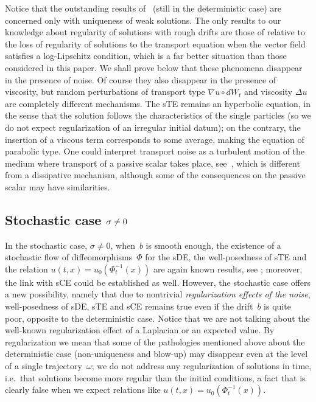 \documentclass[a4paper,10pt]{article}
\newcommand\1{\mathbbm{1}}
\numberwithin{equation}{section}
\begin{document}
Notice that the outstanding results of~\cite{DIPELI89,AMBROSIO04} (still in the deterministic case) are concerned only with uniqueness of weak solutions. The only results to our knowledge about regularity of solutions with rough drifts are those of \cite[Section~3.3]{BahCheDan} relative to the loss of regularity of solutions to the transport equation when the vector field satisfies a log-Lipschitz condition, which is a far better situation than those considered in this paper. We shall prove below that these phenomena disappear in the presence of noise. Of course they also disappear in the presence of viscosity, but random perturbations of transport type $\nabla u\circ dW_{t}$ and viscosity $\Delta u$ are completely different mechanisms. The sTE remains an hyperbolic equation, in the sense that the solution follows the characteristics of the single particles (so we do not expect regularization of an irregular initial datum); on the contrary, the insertion of a viscous term corresponds to some average, making the equation of parabolic type. One could interpret transport noise as a turbulent motion of the medium where transport of a
passive scalar takes place, see~\cite{GaKuVe}, which is different from a dissipative mechanism, although some of the consequences on the passive scalar may have similarities.

\subsection{Stochastic case $\protect\sigma\neq0$}

In the stochastic case, $\sigma\neq0$, when~$b$ is smooth enough, the existence of a stochastic flow of diffeomorphisms~$\Phi$ for the sDE, the well-posedness of sTE and the relation $u(t,x) =u_{0}(\Phi_{t}^{-1}(x) )$ are again known results, see \cite{KUNITA84a,KUNITA84,KUNITA90}; moreover, the link with sCE could be established as well. However, the stochastic case offers a new possibility, namely that due to nontrivial \emph{regularization effects of the noise}, well-posedness of sDE, sTE and sCE remains true even if the drift~$b$ is quite poor, opposite to the deterministic case. Notice that we are not talking about the well-known regularization effect of a Laplacian or an expected value. By regularization we mean that some of the pathologies mentioned above about the deterministic case (non-uniqueness and blow-up) may disappear even at the level of a single trajectory~$\omega$; we do not address any regularization of solutions in time, i.e.~that solutions become more regular than the initial conditions, a fact that is clearly false when we expect relations like $u(t,x) =u_{0}(\Phi_{t}^{-1}(x))$. 
\end{document}
